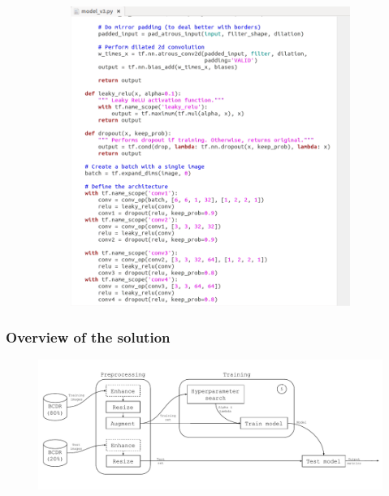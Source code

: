 \documentclass{beamer}
\begin{document}
\begin{frame}
\begin{figure}
\begin{subfigure}{0.5\textwidth}
				\includegraphics[width=\textwidth]{plots/code.png}
			\end{subfigure}
		\end{figure}
	\end{frame}
	
	\begin{frame}
	    \frametitle{Overview of the solution}
		\begin{figure}
			\centering
			\includegraphics[width=\textwidth]{plots/overview.pdf}
		\end{figure}
	\end{frame}
	
\end{document}
